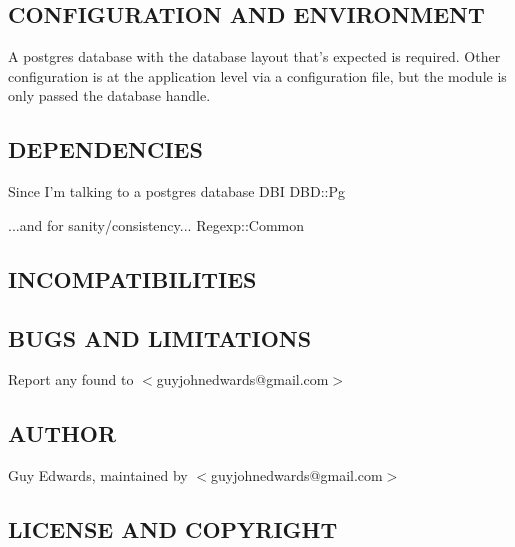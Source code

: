 \documentclass{book}
\begin{document}
\subsection{CONFIGURATION AND ENVIRONMENT}
\label{Inventory_CONFIGURATION_AND_ENVIRONMENT}
\hypertarget{Inventory_CONFIGURATION_AND_ENVIRONMENT}{}



A postgres database with the database layout that's expected is required. Other configuration is at the application level via a configuration file, but the module is only passed the database handle.


\subsection{DEPENDENCIES}
\label{Inventory_DEPENDENCIES}
\hypertarget{Inventory_DEPENDENCIES}{}



Since I'm talking to a postgres database DBI DBD::Pg



...and for sanity/consistency... Regexp::Common


\subsection{INCOMPATIBILITIES}
\label{Inventory_INCOMPATIBILITIES}
\hypertarget{Inventory_INCOMPATIBILITIES}{}


\subsection{BUGS AND LIMITATIONS}
\label{Inventory_BUGS_AND_LIMITATIONS}
\hypertarget{Inventory_BUGS_AND_LIMITATIONS}{}



Report any found to $<$guyjohnedwards@gmail.com$>$


\subsection{AUTHOR}
\label{Inventory_AUTHOR}
\hypertarget{Inventory_AUTHOR}{}



Guy Edwards, maintained by $<$guyjohnedwards@gmail.com$>$


\subsection{LICENSE AND COPYRIGHT}
\label{Inventory_LICENSE_AND_COPYRIGHT}
\hypertarget{Inventory_LICENSE_AND_COPYRIGHT}{}
\end{document}

